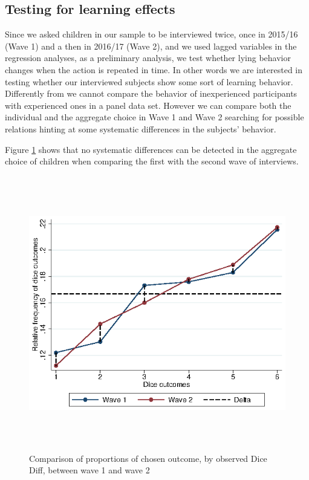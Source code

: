 \documentclass[authoryear, preprint, review, 12pt]{elsarticle}
\begin{document}
\subsection{Testing for learning effects}
\label{subsec:learning}

Since we asked children in our sample to be interviewed twice, once in 2015/16 (Wave 1) and a then in 2016/17 (Wave 2), and we used lagged variables in the regression analyses, as a preliminary analysis, we test whether lying behavior changes when the action is repeated in time. In other words we are interested in testing whether our interviewed subjects show some sort of learning behavior. 
Differently from \cite{ff13} we cannot compare the behavior of inexperienced participants with experienced ones in a panel data set. However we can compare both the individual and the aggregate choice in Wave 1 and Wave 2 searching for possible relations hinting at some systematic differences in the subjects' behavior.

Figure \ref{fig:dicediff} shows that no systematic differences can be detected in the aggregate choice of children when comparing the first with the second wave of interviews.

\begin{figure}[h!]
\centering
\includegraphics[width=12cm,height=12cm, keepaspectratio]{figures/dice_w1w2compare.eps}
\caption{Comparison of proportions of chosen outcome, by observed Dice Diff, between wave 1 and wave 2}
\label{fig:dicediff}
\end{figure}
\end{document}
